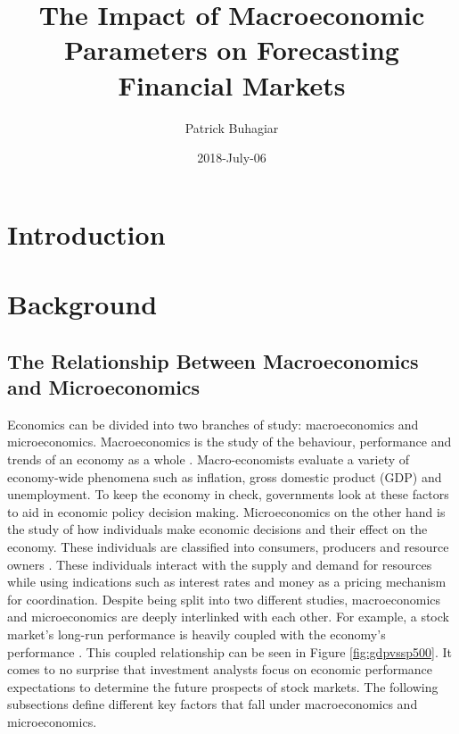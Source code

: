 \documentclass{UoYCSproject}
\author{Patrick Buhagiar}
\title{The Impact of Macroeconomic Parameters on Forecasting Financial Markets}
\date{2018-July-06}
\begin{document}
\maketitle

\listoffigures
\listoftables

\label{sec:start}
\thispagestyle{empty}\cleardoublepage

\chapter{Introduction}
\label{cha:introduction}



\chapter{Background}
\label{cha:background}

\section{The Relationship Between Macroeconomics and Microeconomics}
Economics can be divided into two branches of study: macroeconomics and microeconomics. Macroeconomics is the study of the behaviour, performance and trends of an economy as a whole \cite{2003economics}. Macro-economists evaluate a variety of economy-wide phenomena such as inflation, gross domestic product (GDP) and unemployment. To keep the economy in check, governments look at these factors to aid in economic policy decision making. Microeconomics on the other hand is the study of how individuals make economic decisions and their effect on the economy. These individuals are classified into consumers, producers and resource owners \cite{dwivedi2002microeconomics}. These individuals interact with the supply and demand for resources while using indications such as interest rates and money as a pricing mechanism for coordination.  Despite being split into two different studies, macroeconomics and microeconomics are deeply interlinked with each other. For example, a stock market's long-run performance is heavily coupled with the economy's performance \cite{davis2008macroeconomic}. This coupled relationship can be seen in Figure \ref{fig:gdpvssp500}. It comes to no surprise that investment analysts focus on economic performance expectations to determine the future prospects of stock markets. The following subsections define different key factors that fall under macroeconomics and microeconomics.
\end{document}
